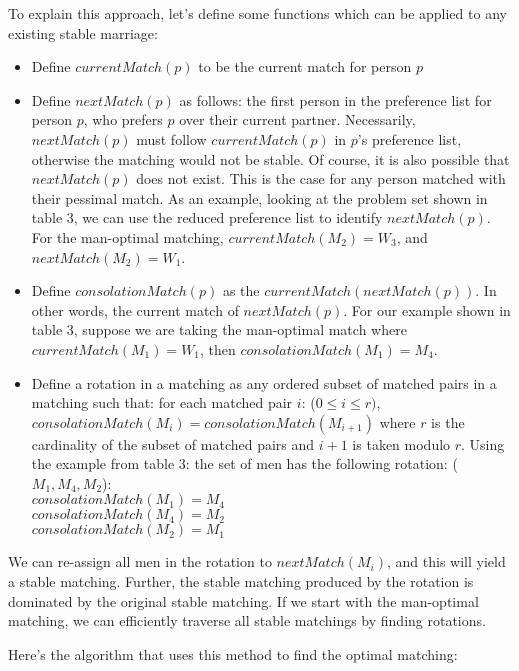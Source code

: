\documentclass[a4paper]{article}
\begin{document}
To explain this approach, let's define some functions which can be applied to any existing stable marriage:
\begin{itemize}
    \item Define $currentMatch(p)$ to be the current match for person $p$
    \item Define $nextMatch(p)$ as follows: the first person in the preference list for person $p$, who prefers $p$ over their current partner. Necessarily, $nextMatch(p)$ must follow $currentMatch(p)$ in $p$'s preference list, otherwise the matching would not be stable. Of course, it is also possible that $nextMatch(p)$ does not exist. This is the case for any person matched with their pessimal match. As an example, looking at the problem set shown in table 3, we can use the reduced preference list to identify $nextMatch(p)$.  For the man-optimal matching, $currentMatch(M_2) = W_3$, and $nextMatch(M_2) = W_1$.
    \item Define $consolationMatch(p)$ as the $currentMatch(nextMatch(p))$. In other words, the current match of $nextMatch(p)$. For our example shown in table 3, suppose we are taking the man-optimal match where $currentMatch(M_1) = W_1$, then $consolationMatch(M_1) = M_4$.
    \item Define a rotation in a matching as any ordered subset of matched pairs in a matching such that: for each matched pair $i$: ($0 \leq i \leq r)$, $consolationMatch(M_i) = consolationMatch (M_{i+1})$ where $r$ is the cardinality of the subset of matched pairs and $i+1$ is taken modulo $r$. Using the example from table 3: the set of men has the following rotation: ($M_1, M_4, M_2$): \\
    $consolationMatch(M_1) = M_4$ \\
    $consolationMatch(M_4) = M_2$ \\
    $consolationMatch(M_2) = M_1$ \\
\end{itemize}

We can re-assign all men in the rotation to $nextMatch(M_i)$, and this will yield a stable matching. Further, the stable matching produced by the rotation is dominated by the original stable matching. If we start with the man-optimal matching, we can efficiently traverse all stable matchings by finding rotations.

Here's the algorithm that uses this method to find the optimal matching:
\end{document}
